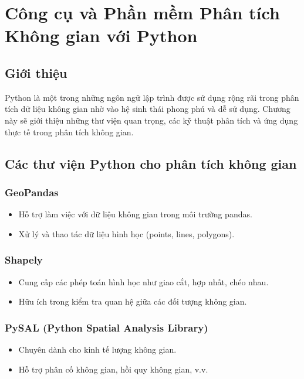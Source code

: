 \chapter{Công cụ và Phần mềm Phân tích Không gian với Python}
\section{Giới thiệu}
Python là một trong những ngôn ngữ lập trình được sử dụng rộng rãi trong phân tích dữ liệu không gian nhờ vào hệ sinh thái phong phú và dễ sử dụng. Chương này sẽ giới thiệu những thư viện quan trọng, các kỹ thuật phân tích và ứng dụng thực tế trong phân tích không gian.

\section{Các thư viện Python cho phân tích không gian}
\subsection{GeoPandas}
\begin{itemize}
    \item Hỗ trợ làm việc với dữ liệu không gian trong môi trường pandas.
    \item Xử lý và thao tác dữ liệu hình học (points, lines, polygons).
\end{itemize}

\subsection{Shapely}
\begin{itemize}
    \item Cung cấp các phép toán hình học như giao cắt, hợp nhất, chéo nhau.
    \item Hữu ích trong kiểm tra quan hệ giữa các đối tượng không gian.
\end{itemize}

\subsection{PySAL (Python Spatial Analysis Library)}
\begin{itemize}
    \item Chuyên dành cho kinh tế lượng không gian.
    \item Hỗ trợ phân cố không gian, hồi quy không gian, v.v.
\end{itemize}

